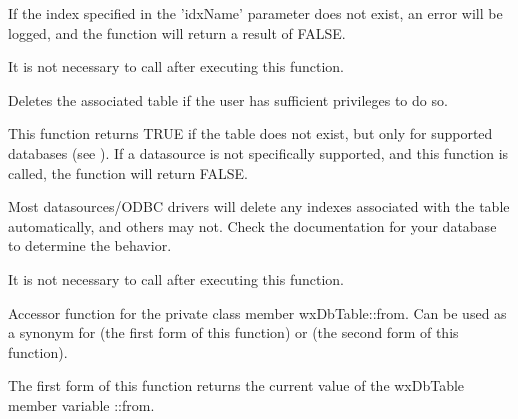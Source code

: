 
If the index specified in the 'idxName' parameter does not exist, an error 
will be logged, and the function will return a result of FALSE.

It is not necessary to call  
after executing this function.


\label{wxdbtabledroptable}


Deletes the associated table if the user has sufficient privileges to do so.


This function returns TRUE if the table does not exist, but only for 
supported databases (see ).  If a datasource 
is not specifically supported, and this function is called, the function 
will return FALSE.

Most datasources/ODBC drivers will delete any indexes associated with the 
table automatically, and others may not.  Check the documentation for your 
database to determine the behavior.

It is not necessary to call  
after executing this function.


\label{wxdbtablefrom}



Accessor function for the private class member wxDbTable::from.  Can be used 
as a synonym for  
(the first form of this function) or  
 (the second form 
of this function).




The first form of this function returns the current value of the wxDbTable 
member variable ::from.  

